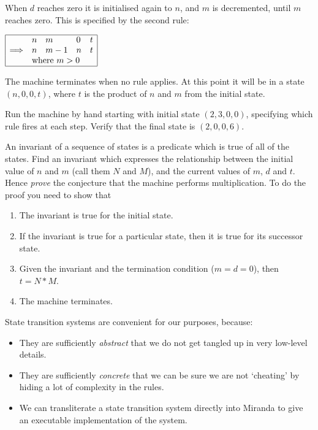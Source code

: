 When $d$ reaches zero it is initialised again to $n$, and $m$ is decremented,
until $m$ reaches zero.  This is specified by the second rule:
\begin{flushleft}
\qquad $\begin{array}{|lllll|}
\hline
                & n & m & 0 & t         \\
\Longrightarrow & n & m-1 & n & t       \\
                & \multicolumn{4}{l|}{\mbox{where}~m>0} \\
\hline
\end{array}$
\end{flushleft}
The machine terminates when no rule applies.  At this point it will be
in a state $(n,0,0,t)$, where $t$ is the product of $n$ and $m$ from the
initial state.

\begin{exercise}
Run the machine by hand
starting with initial state $(2,3,0,0)$, specifying
which rule fires at each step.  Verify that the final state is $(2,0,0,6)$.
\end{exercise}

\begin{exercise}
An invariant of a sequence of states is a predicate
which is true of all of the states.  Find an invariant which expresses
the relationship between the initial value of $n$ and $m$ (call them
$N$ and $M$), and the current values of $m$, $d$ and $t$.  Hence {\em
prove\/} the conjecture that the machine performs multiplication.  To do
the proof you need to show that
\begin{enumerate}
\item
The invariant is true for the initial state.
\item
If the invariant is true for a particular state, then it is
true for its successor state.
\item
Given the invariant and the termination condition ($m=d=0$),
then $t = N*M$.
\item
The machine terminates.
\end{enumerate}
\end{exercise}

State transition systems are convenient for our purposes, because:
\begin{itemize}
\item
They are sufficiently {\em abstract\/} that we do not get tangled up in very
low-level details.
\item
They are sufficiently {\em concrete\/} that we can be sure we are
not `cheating' by hiding a lot of complexity in the rules.
\item
We can transliterate a state transition system directly into Miranda
to give an executable implementation of the system.
\end{itemize}

